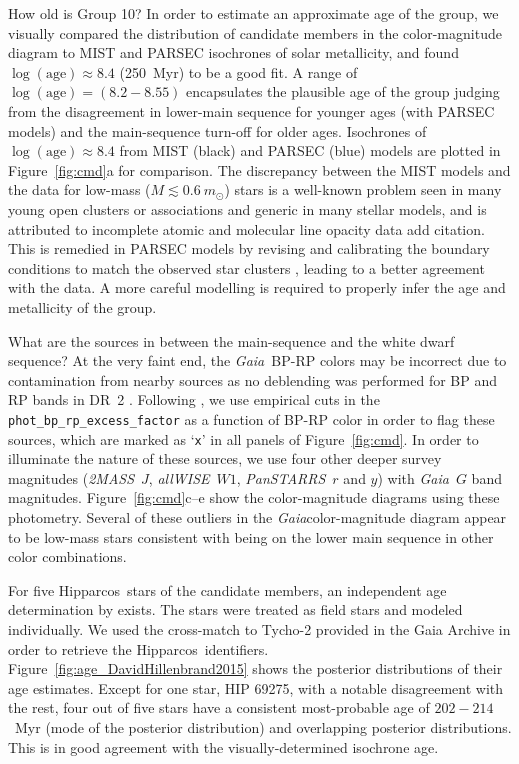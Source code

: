 \documentclass[modern,letterpaper]{aastex61}
\newcommand{\project}[1]{\textsl{#1}}
\newcommand{\acronym}[1]{{\small{#1}}}
\newcommand{\hipparcos}{Hipparcos}
\newcommand{\gaia}{\project{Gaia}}
\newcommand{\tmass}{\project{\acronym{2MASS}}}
\newcommand{\allwise}{\project{\acronym{allWISE}}}
\newcommand{\panstarrs}{\project{\acronym{PanSTARRS}}}
\newcommand{\figname}{Figure}
\newcommand{\groupTen}{Group 10}
\newcommand{\todo}[1]{{\color{crimson}#1}}
\begin{document}
How old is \groupTen?
In order to estimate an approximate age of the group,
we visually compared the distribution of candidate members in the color-magnitude diagram
to MIST \citep[][with rotation]{2016ApJ...823..102C} and
PARSEC isochrones \citep[v1.2S;][]{2012MNRAS.427..127B,2015MNRAS.452.1068C}
of solar metallicity,
and found $\log(\mathrm{age}) \approx 8.4$ (250~Myr) to be a good fit.
A range of $\log(\mathrm{age}) = (8.2-8.55)$ encapsulates the plausible
age of the group judging from the disagreement in lower-main sequence for
younger ages (with PARSEC models) and the main-sequence turn-off for older ages.
Isochrones of $\log(\mathrm{age}) \approx 8.4$
from MIST (black) and PARSEC (blue) models are plotted in \figname~\ref{fig:cmd}a
for comparison.
The discrepancy between the MIST models and the data for low-mass
($M\lesssim0.6~m_\odot$) stars is a well-known problem seen in many young open
clusters or associations and generic in many stellar models, and is attributed
to incomplete atomic and molecular line opacity data \todo{add citation}.
This is remedied in PARSEC models by revising and calibrating the boundary
conditions to match the observed star clusters
\citep{2014MNRAS.444.2525C}, leading to a better agreement with the data.
A more careful modelling is required to properly infer the age and metallicity
of the group.

What are the sources in between the main-sequence and the white dwarf sequence?
At the very faint end, the \gaia\ BP-RP colors may be incorrect due to
contamination from nearby sources as no deblending was performed for BP and RP
bands in DR~2 \citep{2018arXiv180409368E}.
Following \citet{2018arXiv180409378G}, we use empirical cuts in the
\texttt{phot\_bp\_rp\_excess\_factor} as a function of BP-RP color in order to
flag these sources, which are marked as `\texttt{x}' in all panels of
Figure~\ref{fig:cmd}.
In order to illuminate the nature of these sources, we use four other deeper
survey magnitudes (\tmass\ $J$, \allwise\ $W1$, \panstarrs\ $r$ and $y$) with
\gaia\ $G$ band magnitudes.
\figname~\ref{fig:cmd}c--e show the color-magnitude diagrams using these photometry.
%
Several of these outliers in the \gaia color-magnitude diagram appear to be low-mass stars consistent with being on the lower main sequence in other color combinations.

For five \hipparcos\ stars of the candidate members,
an independent age determination by \citet{2015ApJ...804..146D} exists.
The stars were treated as field stars and modeled individually.
We used the cross-match to Tycho-2 provided in the Gaia Archive
in order to retrieve the \hipparcos\ identifiers.
Figure~\ref{fig:age_DavidHillenbrand2015} shows the posterior distributions
of their age estimates.
Except for one star, HIP 69275, with a notable disagreement with the rest,
four out of five stars have a consistent most-probable age of $202-214$~Myr
(mode of the posterior distribution) and overlapping posterior distributions.
This is in good agreement with the visually-determined isochrone age.
\end{document}
